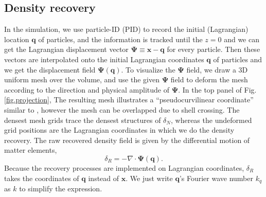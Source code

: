 \documentclass[aps,prd,twocolumn,superscriptaddress,amsfont,amssymb,amsmath,nofootinbib,showpacs,balancelastpage]{revtex4-1}
\newcommand{\bs}{\boldsymbol}
\begin{document}
\subsection{Density recovery}\label{ss.reco}
In the simulation, we use particle-ID (PID) to record the initial (Lagrangian) location ${\bs 
q}$ of particles, and the information is tracked until the $z=0$ and we can get the 
Lagrangian displacement vector ${\bs \Psi}\equiv{\bs x}-{\bs q}$ for every 
particle. Then these vectors are interpolated onto the initial Lagrangian 
coordinates ${\bs q}$ of particles and we get the displacement field ${\bs \Psi}
({\bs q})$.
To visualize the $\bs\Psi$ field, we draw a 3D uniform mesh over the volume,
and use the given $\bs\Psi$ field to deform the mesh according to the direction
and physical amplitude of $\bs\Psi$. In the top panel of Fig.\ref{fig.projection},
The resulting mesh illustrates a ``pseudocurvilinear coordinate'' similar to \cite{1995ApJS..100..269P},
however the mesh can be overlapped due to shell crossing. The densest mesh grids
trace the densest structures of $\delta_N$, whereas the undeformed grid positions
are the Lagrangian coordinates in which we do the density recovery.
The raw recovered density field is given by the differential motion of matter 
elements,
\begin{equation}
    \delta_R=-\nabla\cdot{\bs \Psi}({\bs q}).
\end{equation}
Because the recovery processes are implemented on Lagrangian coordinates,
$\delta_R$ takes the coordinates of $\bs q$ instead of $\bs x$.
We just write $\bs q$'s Fourier wave number
$k_q$ as $k$ to simplify the expression.
\end{document}
